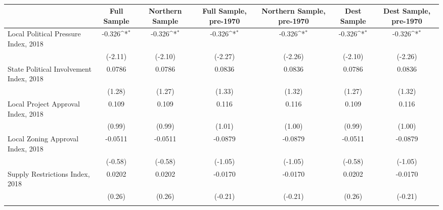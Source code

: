 \begin{table}[htbp]\centering
\def\sym#1{\ifmmode^{#1}\else\(^{#1}\)\fi}
\caption{ \label{tab1}}
\begin{tabular}{l*{6}{c}}
\toprule
                    &\multicolumn{1}{c}{Full Sample}&\multicolumn{1}{c}{Northern Sample}&\multicolumn{1}{c}{Full Sample, pre-1970}&\multicolumn{1}{c}{Northern Sample, pre-1970}&\multicolumn{1}{c}{Dest Sample}&\multicolumn{1}{c}{Dest Sample, pre-1970}\\
\midrule
Local Political Pressure Index, 2018&      -0.326\sym{*}  &      -0.326\sym{*}  &      -0.326\sym{*}  &      -0.326\sym{*}  &      -0.326\sym{*}  &      -0.326\sym{*}  \\
                    &     (-2.11)         &     (-2.10)         &     (-2.27)         &     (-2.26)         &     (-2.10)         &     (-2.26)         \\
\addlinespace
State Political Involvement Index, 2018&      0.0786         &      0.0786         &      0.0836         &      0.0836         &      0.0786         &      0.0836         \\
                    &      (1.28)         &      (1.27)         &      (1.33)         &      (1.32)         &      (1.27)         &      (1.32)         \\
\addlinespace
Local Project Approval Index, 2018&       0.109         &       0.109         &       0.116         &       0.116         &       0.109         &       0.116         \\
                    &      (0.99)         &      (0.99)         &      (1.01)         &      (1.00)         &      (0.99)         &      (1.00)         \\
\addlinespace
Local Zoning Approval Index, 2018&     -0.0511         &     -0.0511         &     -0.0879         &     -0.0879         &     -0.0511         &     -0.0879         \\
                    &     (-0.58)         &     (-0.58)         &     (-1.05)         &     (-1.05)         &     (-0.58)         &     (-1.05)         \\
\addlinespace
Supply Restrictions Index, 2018&      0.0202         &      0.0202         &     -0.0170         &     -0.0170         &      0.0202         &     -0.0170         \\
                    &      (0.26)         &      (0.26)         &     (-0.21)         &     (-0.21)         &      (0.26)         &     (-0.21)         \\
\addlinespace

\end{tabular}
\end{table}
